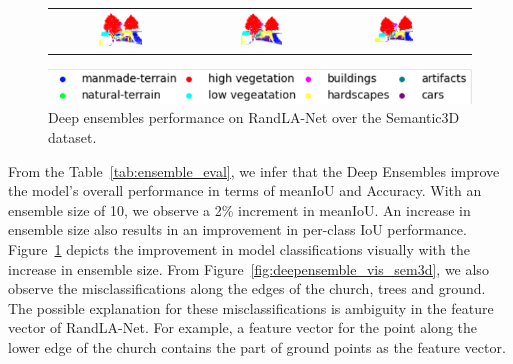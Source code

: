\begin{figure}[h!]
\begin{tabular}{cccc}
            \includegraphics[width=0.33\textwidth, height=0.18\textheight]{images/seg_output/deep_ensembles/2_1.png} &
            \includegraphics[width=0.33\textwidth, height=0.18\textheight]{images/seg_output/deep_ensembles/2_5.png}& 
            \includegraphics[width=0.33\textwidth, height=0.18\textheight]{images/seg_output/deep_ensembles/2_10.png}\\
        \end{tabular}
        \includegraphics[scale=0.65]{images/legend.png}
        \caption{Deep ensembles performance on RandLA-Net over the Semantic3D dataset.}
        \label{fig:deepensemble_improv}
    \end{figure}

    From the Table~\ref{tab:ensemble_eval}, we infer that the Deep Ensembles improve the model's overall performance in terms of meanIoU and Accuracy.
    With an ensemble size of 10, we observe a 2\% increment in meanIoU.
    An increase in ensemble size also results in an improvement in per-class IoU performance.
    Figure~\ref{fig:deepensemble_improv} depicts the improvement in model classifications visually with the increase in ensemble size.
    From Figure~\ref{fig:deepensemble_vis_sem3d}, we also observe the misclassifications along the edges of the church, trees and ground.
    The possible explanation for these misclassifications is ambiguity in the feature vector of RandLA-Net. For example, a feature vector for the point along the lower edge of the church contains the part of ground points as the feature vector.
